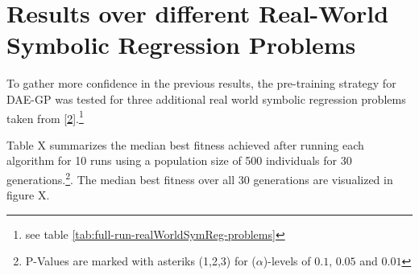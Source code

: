 \documentclass[
  11pt,
]{article}
\begin{document}
\hypertarget{results-over-different-real-world-symbolic-regression-problems}{%
\section{Results over different Real-World Symbolic Regression Problems}\label{results-over-different-real-world-symbolic-regression-problems}}

To gather more confidence in the previous results, the pre-training strategy for DAE-GP was tested for three additional real world symbolic regression problems taken from {[}\protect\hyperlink{ref-machine_learning_repo}{2}{]}.\footnote{see table \ref{tab:full-run-realWorldSymReg-problems}}

Table X summarizes the median best fitness achieved after running each algorithm for 10 runs using a population size of 500 individuals for 30 generations.\footnote{P-Values are marked with asteriks (1,2,3) for (\(\alpha\))-levels of \(0.1\), \(0.05\) and \(0.01\)}. The median best fitness over all 30 generations are visualized in figure X.
\end{document}
